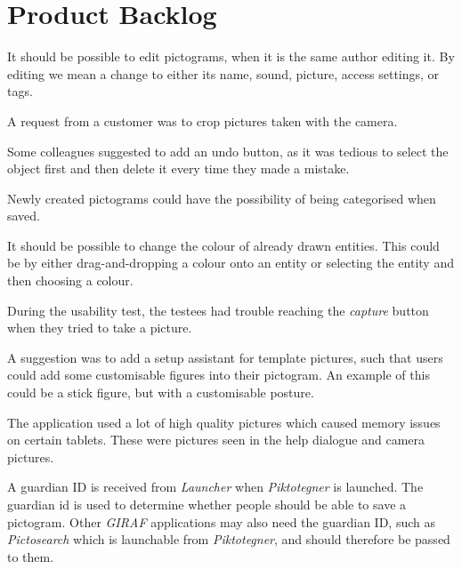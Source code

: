 \chapter{Product Backlog}
\begin{description}[style=nextline]
\item[Editing pictograms]
It should be possible to edit pictograms, when it is the same author editing it. 
By editing we mean a change to either its name, sound, picture, access settings, or tags.

\item[Crop camera pictures]
A request from a customer was to crop pictures taken with the camera.

\item[Undo button]
Some colleagues suggested to add an undo button, as it was tedious to select the object first and then delete it every time they made a mistake.

\item[Categorising pictograms]
Newly created pictograms could have the possibility of being categorised when saved.

\item[Change colour of drawn entities]
It should be possible to change the colour of already drawn entities.
This could be by either drag-and-dropping a colour onto an entity or selecting the entity and then choosing a colour.

\item[Camera fragment buttons]
During the usability test, the testees had trouble reaching the \textit{capture} button when they tried to take a picture.

\item[Template pictures]
A suggestion was to add a setup assistant for template pictures, such that users could add some customisable figures into their pictogram.
An example of this could be a stick figure, but with a customisable posture. 

\item[Memory issues]
The application used a lot of high quality pictures which caused memory issues on certain tablets. 
These were pictures seen in the help dialogue and camera pictures.

\item[Send the guardian id to \textit{Pictosearch}]
A guardian ID is received from \textit{Launcher} when \textit{Piktotegner} is launched.
The guardian id is used to determine whether people should be able to save a pictogram.
Other \textit{GIRAF} applications may also need the guardian ID, such as \textit{Pictosearch} which is launchable from \textit{Piktotegner}, and should therefore be passed to them.


\end{description}
